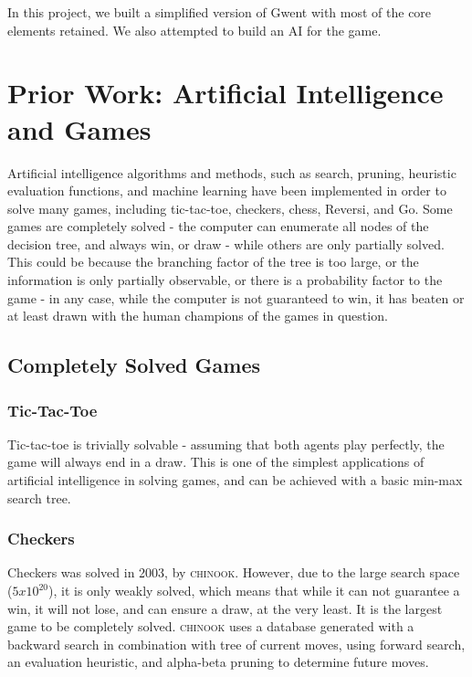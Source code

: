 \documentclass[numbers]{sigplanconf}
\begin{document}
In this project, we built a simplified version of Gwent with most of the core elements retained. We also attempted to build an AI for the game. 

\section{Prior Work: Artificial Intelligence and Games}
Artificial intelligence algorithms and methods, such as search, pruning, heuristic evaluation functions, and machine learning have been implemented in order to solve many games, including tic-tac-toe, checkers, chess, Reversi, and Go. Some games are completely solved - the computer can enumerate all nodes of the decision tree, and always win, or draw - while others are only partially solved. This could be because the branching factor of the tree is too large, or the information is only partially observable, or there is a probability factor to the game - in any case, while the computer is not guaranteed to win, it has beaten or at least drawn with the human champions of the games in question.

\subsection{Completely Solved Games}
\subsubsection{Tic-Tac-Toe}
Tic-tac-toe is trivially solvable - assuming that both agents play perfectly, the game will always end in a draw. This is one of the simplest applications of artificial intelligence in solving games, and can be achieved with a basic min-max search tree\cite{russell2003artificial}.

\subsubsection{Checkers}
Checkers was solved in 2003, by \textsc{chinook}\cite{schaeffer2007checkers}. However, due to the large search space ($5x10^{20}$), it is only weakly solved, which means that while it can not guarantee a win, it will not lose, and can ensure a draw, at the very least. It is the largest game to be completely solved. \textsc{chinook} uses a database generated with a backward search in combination with tree of current moves, using forward search, an evaluation heuristic, and alpha-beta pruning to determine future moves.
\end{document}
